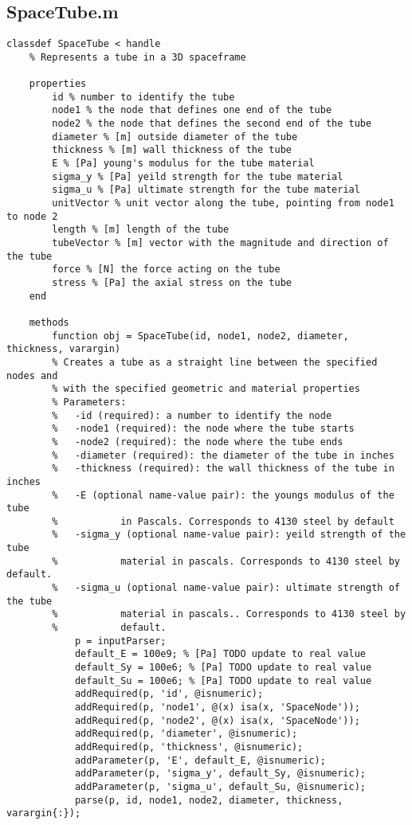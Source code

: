 		\subsection{SpaceTube.m}
\begin{lstlisting}
classdef SpaceTube < handle
	% Represents a tube in a 3D spaceframe
	
	properties
		id % number to identify the tube
		node1 % the node that defines one end of the tube
		node2 % the node that defines the second end of the tube
		diameter % [m] outside diameter of the tube
		thickness % [m] wall thickness of the tube
		E % [Pa] young's modulus for the tube material
		sigma_y % [Pa] yeild strength for the tube material
		sigma_u % [Pa] ultimate strength for the tube material
		unitVector % unit vector along the tube, pointing from node1 to node 2
		length % [m] length of the tube
		tubeVector % [m] vector with the magnitude and direction of the tube
		force % [N] the force acting on the tube
		stress % [Pa] the axial stress on the tube
	end
	
	methods
		function obj = SpaceTube(id, node1, node2, diameter, thickness, varargin)
		% Creates a tube as a straight line between the specified nodes and
		% with the specified geometric and material properties
		% Parameters:
		%   -id (required): a number to identify the node
		%   -node1 (required): the node where the tube starts
		%   -node2 (required): the node where the tube ends
		%   -diameter (required): the diameter of the tube in inches
		%   -thickness (required): the wall thickness of the tube in inches
		%   -E (optional name-value pair): the youngs modulus of the tube
		%           in Pascals. Corresponds to 4130 steel by default
		%   -sigma_y (optional name-value pair): yeild strength of the tube
		%           material in pascals. Corresponds to 4130 steel by default.
		%   -sigma_u (optional name-value pair): ultimate strength of the tube
		%           material in pascals.. Corresponds to 4130 steel by 
		%           default.
			p = inputParser;
			default_E = 100e9; % [Pa] TODO update to real value
			default_Sy = 100e6; % [Pa] TODO update to real value
			default_Su = 100e6; % [Pa] TODO update to real value
			addRequired(p, 'id', @isnumeric);
			addRequired(p, 'node1', @(x) isa(x, 'SpaceNode'));
			addRequired(p, 'node2', @(x) isa(x, 'SpaceNode'));
			addRequired(p, 'diameter', @isnumeric);
			addRequired(p, 'thickness', @isnumeric);
			addParameter(p, 'E', default_E, @isnumeric);
			addParameter(p, 'sigma_y', default_Sy, @isnumeric);
			addParameter(p, 'sigma_u', default_Su, @isnumeric);
			parse(p, id, node1, node2, diameter, thickness, varargin{:});
			

\end{lstlisting}
